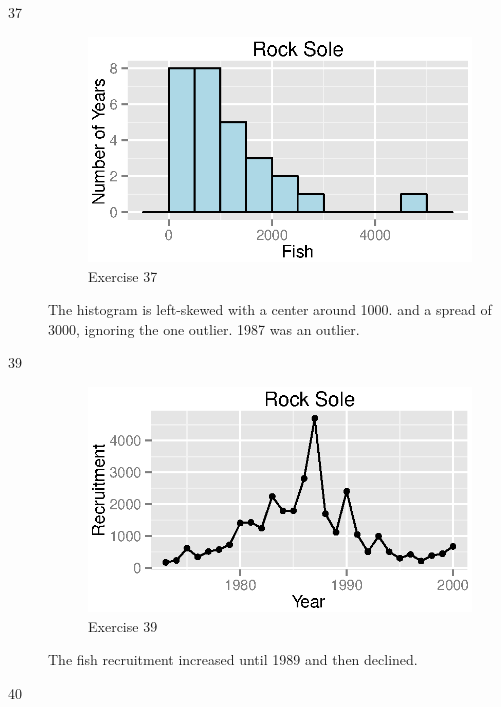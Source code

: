 \documentclass{exam}
\begin{document}
\begin{description}
      \item[37]
        \begin{figure}[H]
          \centering
          \includegraphics{figures/ex37.eps}
          \caption{Exercise 37}
        \end{figure}

        The histogram is left-skewed with a center around 1000. and a spread of 3000, ignoring the one outlier.  1987
        was an outlier. 

      \item[39]
        \begin{figure}[H]
          \centering
          \includegraphics{figures/ex39.eps}
          \caption{Exercise 39}
        \end{figure}

        The fish recruitment increased until 1989 and then declined.

      \item[40]
\end{description}
\end{document}
